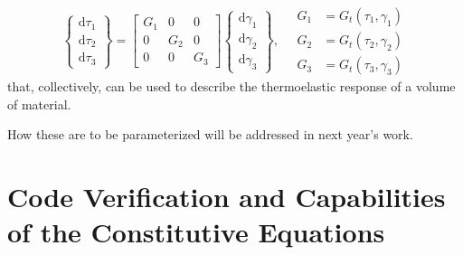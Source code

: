 \begin{displaymath}
    \left\{ \begin{matrix}
    \mathrm{d} \tau_1 \\ \mathrm{d} \tau_2 \\ \mathrm{d} \tau_3
    \end{matrix} \right\} = \begin{bmatrix}
    G_1 & 0 & 0 \\ 0 & G_2 & 0 \\ 0 & 0 & G_3
    \end{bmatrix} \left\{ \begin{matrix}
    \mathrm{d} \gamma_1 \\ \mathrm{d} \gamma_2 \\ \mathrm{d} \gamma_3
    \end{matrix} \right\} , \quad
    \begin{aligned}
    G_1 & = G_t ( \tau_1 , \gamma_1 ) \\
    G_2 & = G_t ( \tau_2 , \gamma_2 ) \\
    G_3 & = G_t ( \tau_3 , \gamma_3 )
    \end{aligned}
\end{displaymath}
that, collectively, can be used to describe the thermo\-elastic response of a volume of material.  

How these are to be parameterized will be addressed in next year's work.


\section{Code Verification and Capabilities of the Constitutive Equations}
\label{secCE_verifyCode}

